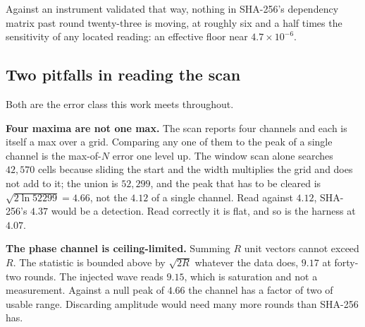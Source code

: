 Against an instrument validated that way, nothing in SHA-256's dependency matrix past round
twenty-three is moving, at roughly six and a half times the sensitivity of any located reading:
an effective floor near \(4.7 \times 10^{-6}\).

\subsection{Two pitfalls in reading the scan}

Both are the error class this work meets throughout.

\textbf{Four maxima are not one max.} The scan reports four channels and each is itself a
max over a grid. Comparing any one of them to the peak of a single channel is the max-of-\(N\)
error one level up. The window scan alone searches \(42{,}570\) cells because sliding the start and
the width multiplies the grid and does not add to it; the union is \(52{,}299\), and the peak
that has to be cleared is \(\sqrt{2 \ln 52299} = 4.66\), not the \(4.12\) of a single channel.
Read against \(4.12\), SHA-256's \(4.37\) would be a detection. Read correctly it is flat, and so is
the harness at \(4.07\).

\textbf{The phase channel is ceiling-limited.} Summing \(R\) unit vectors cannot exceed \(R\). The
statistic is bounded above by \(\sqrt{2R}\) whatever the data does, \(9.17\) at forty-two
rounds. The injected wave reads \(9.15\), which is saturation and not a measurement. Against a
null peak of \(4.66\) the channel has a factor of two of usable range. Discarding amplitude would
need many more rounds than SHA-256 has.
